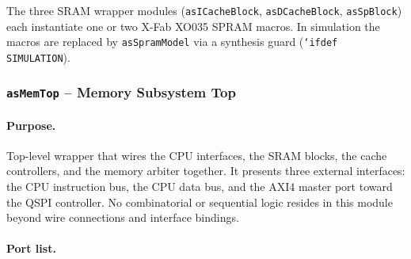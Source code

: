 The three SRAM wrapper modules (\texttt{asICacheBlock}, \texttt{asDCacheBlock},
\texttt{asSpBlock}) each instantiate one or two X-Fab XO035 SPRAM macros.
In simulation the macros are replaced by \texttt{asSpramModel} via a
synthesis guard (\texttt{`ifdef SIMULATION}).

\subsubsection{\texttt{asMemTop} -- Memory Subsystem Top}
\label{subsubsec:asMemTop}

\paragraph{Purpose.}
Top-level wrapper that wires the CPU interfaces, the SRAM blocks, the
cache controllers, and the memory arbiter together.
It presents three external interfaces: the CPU instruction bus, the CPU
data bus, and the AXI4 master port toward the QSPI controller.
No combinatorial or sequential logic resides in this module beyond
wire connections and interface bindings.

\paragraph{Port list.}

